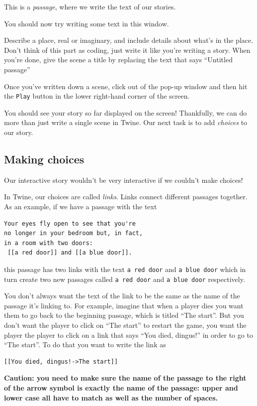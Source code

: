 \documentclass[a5paper,11pt]{article}
\begin{document}
This is a \emph{passage}, where we write the text of our stories.

\begin{framed}
  You should now try writing some text in this window.

  Describe a place, real or imaginary, and include details about what's in the place. Don't think of this part as coding, just write it like you're writing a story. When you're done, give the scene a title by replacing the text that says ``Untitled passage''
\end{framed}

Once you've written down a scene, click out of the pop-up window and then hit the \verb"Play" button in the lower right-hand corner of the screen.

You should see your story so far displayed on the screen! Thankfully, we can do more than just write a single scene in Twine. Our next task is to add \emph{choices} to our story.
\subsection{Making choices}
Our interactive story wouldn't be very interactive if we couldn't make choices!

In Twine, our choices are called \emph{links}. Links connect different passages together. As an example, if we have a passage with the text
\begin{verbatim}
Your eyes fly open to see that you're 
no longer in your bedroom but, in fact, 
in a room with two doors: 
 [[a red door]] and [[a blue door]].
\end{verbatim}
this passage has two links with the text \texttt{a red door} and \texttt{a blue door} which in turn create two new passages called \texttt{a red door} and \texttt{a blue door} respectively.

You don't always want the text of the link to be the same as the name of the passage it's linking to. For example, imagine that when a player dies you want them to go back to the beginning passage, which is titled ``The start''. But you don't want the player to click on ``The start'' to restart the game, you want the player the player to click on a link that says ``You died, dingus!'' in order to go to ``The start''. To do that you want to write the link as
\begin{verbatim}
[[You died, dingus!->The start]]
\end{verbatim}

\textbf{Caution: you need to make sure the name of the passage to the right of the arrow symbol is exactly the name of the passage: upper and lower case all have to match as well as the number of spaces.}
\end{document}
